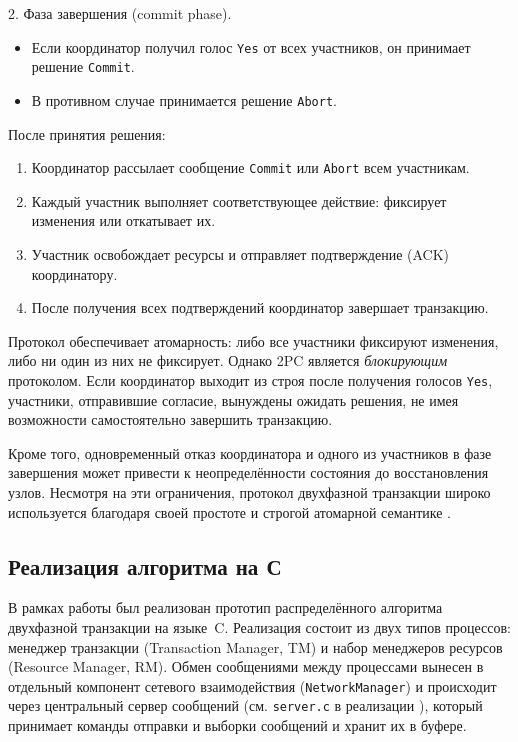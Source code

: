 2. Фаза завершения (commit phase).

\begin{itemize}
    \item Если координатор получил голос \texttt{Yes} от всех участников,
    он принимает решение \texttt{Commit}.
    \item В противном случае принимается решение \texttt{Abort}.
\end{itemize}

После принятия решения:

\begin{enumerate}
    \item Координатор рассылает сообщение \texttt{Commit} или \texttt{Abort}
    всем участникам.
    \item Каждый участник выполняет соответствующее действие:
    фиксирует изменения или откатывает их.
    \item Участник освобождает ресурсы и отправляет подтверждение
    (ACK) координатору.
    \item После получения всех подтверждений координатор завершает транзакцию.
\end{enumerate}

Протокол обеспечивает атомарность: либо все участники фиксируют изменения,
либо ни один из них не фиксирует. Однако 2PC является \emph{блокирующим}
протоколом. Если координатор выходит из строя после получения голосов
\texttt{Yes}, участники, отправившие согласие, вынуждены ожидать решения,
не имея возможности самостоятельно завершить транзакцию.

Кроме того, одновременный отказ координатора и одного из участников в фазе
завершения может привести к неопределённости состояния до восстановления
узлов. Несмотря на эти ограничения, протокол двухфазной транзакции широко
используется благодаря своей простоте и строгой атомарной семантике
\cite{bernstein2009ptp}.

\subsection{Реализация алгоритма на С}

В рамках работы был реализован прототип распределённого алгоритма
двухфазной транзакции на языке~C. Реализация состоит из двух типов
процессов: менеджер транзакции (Transaction Manager, TM) и набор
менеджеров ресурсов (Resource Manager, RM). Обмен сообщениями между
процессами вынесен в отдельный компонент сетевого взаимодействия
(\texttt{NetworkManager}) и происходит через центральный сервер сообщений (см.
\texttt{server.c} в реализации \cite{twophaseimpl}), который принимает команды
отправки и выборки сообщений и хранит их в буфере.

